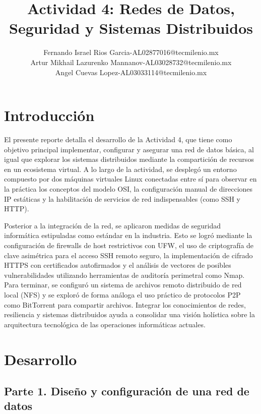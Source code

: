 \documentclass[stu, 12pt, letterpaper, donotrepeattitle, floatsintext, noapacite]{apa7}
\title{Actividad 4: Redes de Datos, Seguridad y Sistemas Distribuidos}
\author{Fernando Israel Rios Garcia-AL02877016@tecmilenio.mx \\
        Artur Mikhail Lazurenko Mannanov-AL03028732@tecmilenio.mx\\
        Angel Cuevas Lopez-AL03033114@tecmilenio.mx}
\affiliation{Universidad Tecmilenio}
\begin{document}
\maketitle

\setcounter{tocdepth}{3}
\setcounter{secnumdepth}{3}
\tableofcontents
\listoffigures
\newpage

\section{Introducción}
El presente reporte detalla el desarrollo de la Actividad 4, que tiene como objetivo principal implementar, configurar y asegurar una red de datos básica, al igual que explorar los sistemas distribuidos mediante la compartición de recursos en un ecosistema virtual. A lo largo de la actividad, se desplegó un entorno compuesto por dos máquinas virtuales Linux conectadas entre sí para observar en la práctica los conceptos del modelo OSI, la configuración manual de direcciones IP estáticas y la habilitación de servicios de red indispensables (como SSH y HTTP). 

Posterior a la integración de la red, se aplicaron medidas de seguridad informática estipuladas como estándar en la industria. Esto se logró mediante la configuración de firewalls de host restrictivos con UFW, el uso de criptografía de clave asimétrica para el acceso SSH remoto seguro, la implementación de cifrado HTTPS con certificados autofirmados y el análisis de vectores de posibles vulnerabilidades utilizando herramientas de auditoría perimetral como Nmap. Para terminar, se configuró un sistema de archivos remoto distribuido de red local (NFS) y se exploró de forma análoga el uso práctico de protocolos P2P como BitTorrent para compartir archivos. Integrar los conocimientos de redes, resiliencia y sistemas distribuidos ayuda a consolidar una visión holística sobre la arquitectura tecnológica de las operaciones informáticas actuales.

\section{Desarrollo}

\subsection{Parte 1. Diseño y configuración de una red de datos}
\end{document}

